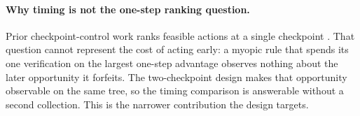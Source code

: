 \paragraph{Why timing is not the one-step ranking question.}
Prior checkpoint-control work ranks feasible actions at a single checkpoint
\citep{calibrationnotcontrol2026}.  That question cannot represent the cost of
acting early: a myopic rule that spends its one verification on the largest
one-step advantage observes nothing about the later opportunity it forfeits.
The two-checkpoint design makes that opportunity observable on the same tree, so
the timing comparison is answerable without a second collection.  This is the
narrower contribution the design targets.
